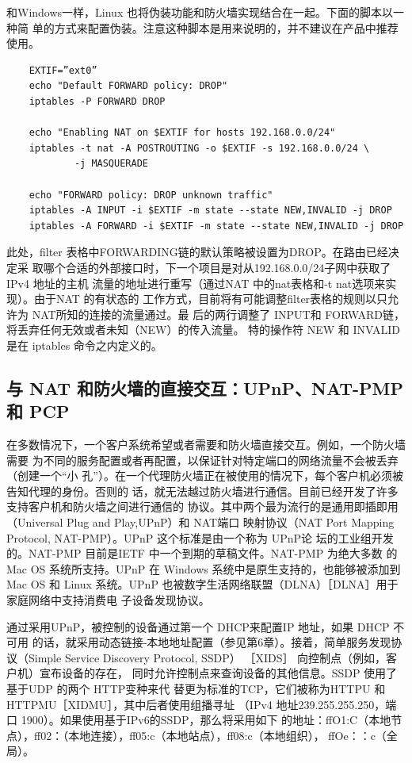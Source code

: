 和Windows一样，Linux 也将伪装功能和防火墙实现结合在一起。下面的脚本以一种简
单的方式来配置伪装。注意这种脚本是用来说明的，并不建议在产品中推荐使用。

\begin{verbatim}
	EXTIF=”ext0”
	echo "Default FORWARD policy: DROP"
	iptables -P FORWARD DROP

	echo "Enabling NAT on $EXTIF for hosts 192.168.0.0/24"
	iptables -t nat -A POSTROUTING -o $EXTIF -s 192.168.0.0/24 \
			-j MASQUERADE

	echo "FORWARD policy: DROP unknown traffic"
	iptables -A INPUT -i $EXTIF -m state --state NEW,INVALID -j DROP
	iptables -A FORWARD -i $EXTIF -m state --state NEW,INVALID -j DROP
\end{verbatim}

此处，filter 表格中FORWARDING链的默认策略被设置为DROP。在路由已经决定采
取哪个合适的外部接口时，下一个项目是对从192.168.0.0/24子网中获取了IPv4 地址的主机
流量的地址进行重写（通过NAT 中的nat表格和-t nat选项来实现）。由于NAT 的有状态的
工作方式，目前将有可能调整filter表格的规则以只允许为 NAT所知的连接的流量通过。最
后的两行调整了 INPUT和 FORWARD链，将丢弃任何无效或者未知（NEW）的传入流量。
特的操作符 NEW 和 INVALID 是在 iptables 命令之内定义的。

\subsection{与 NAT 和防火墙的直接交互：UPnP、NAT-PMP 和 PCP}

在多数情况下，一个客户系统希望或者需要和防火墙直接交互。例如，一个防火墙需要
为不同的服务配置或者再配置，以保证针对特定端口的网络流量不会被丢弃（创建一个“小
孔”）。在一个代理防火墙正在被使用的情况下，每个客户机必须被告知代理的身份。否则的
话，就无法越过防火墙进行通信。目前已经开发了许多支持客户机和防火墙之间进行通信的
协议。其中两个最为流行的是通用即插即用（Universal Plug and Play,UPnP）和 NAT端口
映射协议（NAT Port Mapping Protocol, NAT-PMP）。UPnP 这个标准是由一个称为 UPnP论
坛的工业组开发的。NAT-PMP 目前是IETF 中一个到期的草稿文件。NAT-PMP 为绝大多数
的Mac OS 系统所支持。UPnP 在 Windows 系统中是原生支持的，也能够被添加到 Mac OS
和 Linux 系统。UPnP 也被数字生活网络联盟（DLNA）［DLNA］用于家庭网络中支持消费电
子设备发现协议。

通过采用UPnP，被控制的设备通过第一个 DHCP来配置IP 地址，如果 DHCP 不可用
的话，就采用动态链接-本地地址配置（参见第6章）。接着，简单服务发现协议（Simple
Service Discovery Protocol, SSDP） ［XIDS］ 向控制点（例如，客户机）宣布设备的存在，
同时允许控制点来查询设备的其他信息。SSDP 使用了基于UDP 的两个 HTTP变种来代
替更为标准的TCP，它们被称为HTTPU 和 HTTPMU［XIDMU］，其中后者使用组播寻址
（IPv4 地址239.255.255.250，端口 1900）。如果使用基于IPv6的SSDP，那么将采用如下
的地址：ffO1:C（本地节点），ff02：（本地连接），ff05:c（本地站点），ff08:c（本地组织），
ffOe：：c（全局）。

